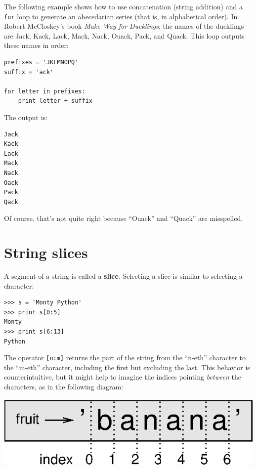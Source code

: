 \documentclass[10pt]{book}
\begin{document}

The following example shows how to use concatenation (string addition)
and a {\tt for} loop to generate an abecedarian series (that is, in
alphabetical order).  In Robert McCloskey's book \emph{Make
Way for Ducklings}, the names of the ducklings are Jack, Kack, Lack,
Mack, Nack, Ouack, Pack, and Quack.  This loop outputs these names in
order:

\beforeverb
\begin{verbatim}
prefixes = 'JKLMNOPQ'
suffix = 'ack'

for letter in prefixes:
    print letter + suffix
\end{verbatim}
\afterverb
%
The output is:

\beforeverb
\begin{verbatim}
Jack
Kack
Lack
Mack
Nack
Oack
Pack
Qack
\end{verbatim}
\afterverb
%
Of course, that's not quite right because ``Ouack'' and
``Quack'' are misspelled.


\section{String slices}
\label{slice}


A segment of a string is called a {\bf slice}.  Selecting a slice is
similar to selecting a character:

\beforeverb
\begin{verbatim}
>>> s = 'Monty Python'
>>> print s[0:5]
Monty
>>> print s[6:13]
Python
\end{verbatim}
\afterverb
%
The operator {\tt [n:m]} returns the part of the string from the 
``n-eth'' character to the ``m-eth'' character, including the first but
excluding the last.  This behavior is counterintuitive, but it might
help to imagine the indices pointing \emph{between} the
characters, as in the following diagram:

\beforefig
\centerline{\includegraphics{figs/banana.eps}}
\afterfig
\end{document}
